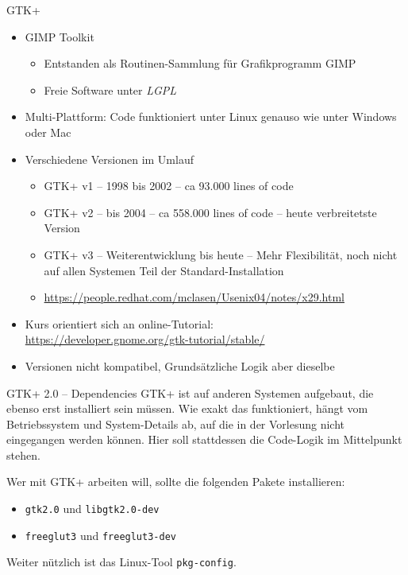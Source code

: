 
\begin{frame}[t,plain]
\titlepage
\end{frame}


\begin{frame}{GTK+}
%
\begin{itemize}
\item GIMP Toolkit
	\begin{itemize}
	\item Entstanden als Routinen-Sammlung für Grafikprogramm GIMP
	\item Freie Software unter \emph{LGPL}
	\end{itemize}
\item Multi-Plattform: Code funktioniert unter Linux genauso wie unter Windows oder Mac
\item Verschiedene Versionen im Umlauf
	\begin{itemize}
	\item GTK+ v1 -- 1998 bis 2002 -- ca  93.000 lines of code
	\item GTK+ v2 -- bis 2004 -- ca 558.000 lines of code -- heute verbreitetste Version
	\item GTK+ v3 -- Weiterentwicklung bis heute -- 
		Mehr Flexibilität, noch nicht auf allen Systemen Teil der Standard-Installation
	\item \url{https://people.redhat.com/mclasen/Usenix04/notes/x29.html}
	\end{itemize}
\item Kurs orientiert sich an online-Tutorial:\\
	\url{https://developer.gnome.org/gtk-tutorial/stable/}
\item Versionen nicht kompatibel, Grundsätzliche Logik aber dieselbe
\end{itemize}

%
\end{frame}


\begin{frame}{GTK+ 2.0 -- Dependencies}
%
GTK+ ist auf anderen Systemen aufgebaut, die ebenso erst installiert sein müssen. Wie exakt das funktioniert, hängt vom Betriebssystem und System-Details ab, auf die in der Vorlesung nicht eingegangen werden können. Hier soll stattdessen die Code-Logik im Mittelpunkt stehen.

\vspace{4pt}
Wer mit GTK+ arbeiten will, sollte die folgenden Pakete installieren:
\begin{itemize}
\item \texttt{gtk2.0} und \texttt{libgtk2.0-dev}
\item \texttt{freeglut3} und \texttt{freeglut3-dev}
\end{itemize}

\vspace{4pt}
Weiter nützlich ist das Linux-Tool \texttt{pkg-config}.
%
\end{frame}


